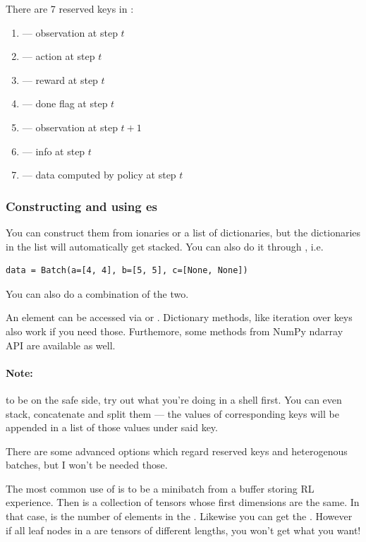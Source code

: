 \documentclass{article}
\begin{document}
There are 7 reserved keys in :
\begin{enumerate}
		\item {} --- observation at step $ t  $
		\item {} --- action at step $ t  $
		\item {} --- reward at step $ t  $
		\item {} --- done flag at step $ t  $
		\item {} --- observation at step $ t+1  $
		\item {} --- info at step $ t  $
		\item {} --- data computed by policy at step $ t  $
\end{enumerate}

\subsubsection{Constructing and using es}
You can construct them from ionaries or a list of dictionaries, but the dictionaries in
the list will automatically get stacked.
You can also do it through , i.e.
\begin{verbatim}
data = Batch(a=[4, 4], b=[5, 5], c=[None, None])
\end{verbatim}
You can also do a combination of the two.

An element can be accessed via  or .
Dictionary methods, like iteration over keys also work if you need those.
Furthemore, some methods from NumPy ndarray API are available as well.
\paragraph{Note:} to be on the safe side, try out what you're doing in a shell first.
You can even stack, concatenate and split them --- the values of corresponding keys will be appended in a list of those values under
said key.

There are some advanced options which regard reserved keys and heterogenous batches, but I won't be needed those.

The most common use of  is to be a minibatch from a buffer storing RL experience.
Then  is a collection of tensors whose first dimensions are the same.
In that case,  is the number of elements in the  .
Likewise you can get the .
However if all leaf nodes in a  are tensors of different lengths, you won't get what you want!
\end{document}
